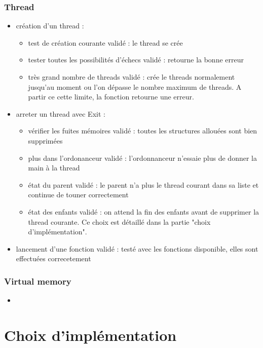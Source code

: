 \documentclass{article}
\begin{document}
		\subsubsection{Thread}
			\begin{itemize}
				\item création d'un thread :
					\begin{itemize}
						\item test de création courante 				validé : le thread se crée
						\item tester toutes les possibilités d'échecs	validé : retourne la bonne erreur
						\item très grand nombre de threads 				validé : crée le threads normalement jusqu'au moment ou l'on dépasse le nombre maximum de threads. A partir ce cette limite, la fonction retourne une erreur.
					\end{itemize}
				\item arreter un thread avec Exit :
					\begin{itemize}
						\item vérifier les fuites mémoires		validé : toutes les structures allouées sont bien supprimées
						\item plus dans l'ordonanceur			validé : l'ordonnanceur n'essaie plus de donner la main à la thread
						\item état du parent					validé : le parent n'a plus le thread courant dans sa liste et continue de touner correctement
						\item état des enfants					validé : on attend la fin des enfants avant de supprimer la thread courante. Ce choix est détaillé dans la partie "choix d'implémentation".
					\end{itemize}
				\item lancement d'une fonction		validé : testé avec les fonctions disponible, elles sont effectuées correcetement
			\end{itemize}

		\subsubsection{Virtual memory}
			\begin{itemize}
				\item 
			\end{itemize}

\section{Choix d'implémentation}
\end{document}
